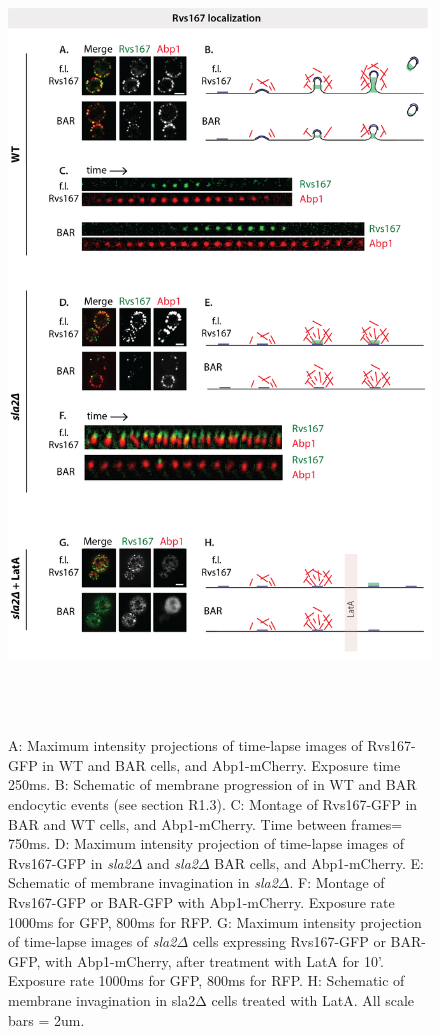  
	\begin{figure}
	\centering
	\includegraphics[width=21cm,height=21cm,keepaspectratio]{figures/results_final/sla2_del_final7}
	\caption [Localization of Rvs167 and BAR with and without membrane curvature]
{A: Maximum intensity projections of time-lapse images of Rvs167-GFP in WT and BAR cells, and Abp1-mCherry. Exposure time 250ms. B: Schematic of membrane progression of in WT and BAR endocytic events (see section R1.3).
C: Montage of Rvs167-GFP in BAR and WT cells, and Abp1-mCherry. Time between frames= 750ms.
D: Maximum intensity projection of time-lapse images of Rvs167-GFP in \textit{sla2$\Delta$} and \textit{sla2$\Delta$} BAR cells, and Abp1-mCherry. 
E: Schematic of membrane invagination in  \textit{sla2$\Delta$}. F: Montage of Rvs167-GFP or BAR-GFP with Abp1-mCherry. Exposure rate 1000ms for GFP, 800ms for RFP. 
G: Maximum intensity projection of time-lapse images of  \textit{sla2$\Delta$} cells expressing Rvs167-GFP or BAR-GFP, with Abp1-mCherry, after treatment with LatA for 10’. Exposure rate 1000ms for GFP, 800ms for RFP. H: Schematic of membrane invagination in sla2Δ cells treated with LatA. 
All scale bars = 2um.
	\label{fig2_sla2del}}
	\end{figure}




